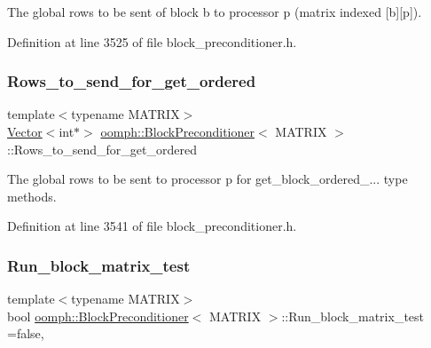 The global rows to be sent of block b to processor p (matrix indexed \mbox{[}b\mbox{]}\mbox{[}p\mbox{]}). 



Definition at line 3525 of file block\+\_\+preconditioner.\+h.

\mbox{\label{classoomph_1_1BlockPreconditioner_a47d5bfe73b47ab79504e878d372dd65f}} 
\subsubsection{\texorpdfstring{Rows\+\_\+to\+\_\+send\+\_\+for\+\_\+get\+\_\+ordered}{Rows\_to\_send\_for\_get\_ordered}}
{\footnotesize\ttfamily template$<$typename M\+A\+T\+R\+IX$>$ \\
\hyperlink{classoomph_1_1Vector}{Vector}$<$int$\ast$$>$ \hyperlink{classoomph_1_1BlockPreconditioner}{oomph\+::\+Block\+Preconditioner}$<$ M\+A\+T\+R\+IX $>$\+::Rows\+\_\+to\+\_\+send\+\_\+for\+\_\+get\+\_\+ordered\hspace{0.3cm}{\ttfamily [private]}}



The global rows to be sent to processor p for get\+\_\+block\+\_\+ordered\+\_\+... type methods. 



Definition at line 3541 of file block\+\_\+preconditioner.\+h.

\mbox{\label{classoomph_1_1BlockPreconditioner_a6e6a40988711a64c622c2fd9104c56cf}} 
\subsubsection{\texorpdfstring{Run\+\_\+block\+\_\+matrix\+\_\+test}{Run\_block\_matrix\_test}}
{\footnotesize\ttfamily template$<$typename M\+A\+T\+R\+IX$>$ \\
bool \hyperlink{classoomph_1_1BlockPreconditioner}{oomph\+::\+Block\+Preconditioner}$<$ M\+A\+T\+R\+IX $>$\+::Run\+\_\+block\+\_\+matrix\+\_\+test =false\hspace{0.3cm}{\ttfamily [static]}, {\ttfamily [private]}}




